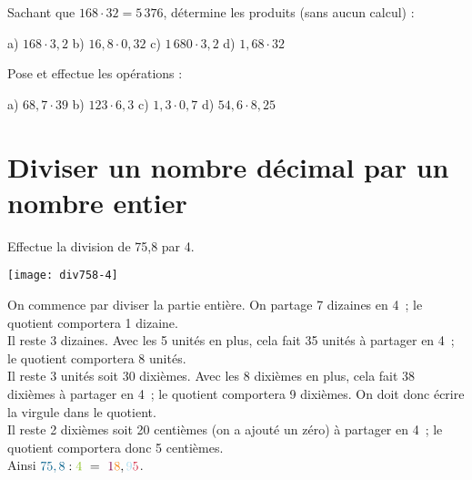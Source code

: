 
Sachant que $168 \cdot 32 = 5\,376$, détermine les produits (sans aucun calcul) :

a) $168 \cdot 3,2$ \hfill b) $16,8 \cdot 0,32$ \hfill  c) $1\,680 \cdot 3,2$ \hfill d) $1,68 \cdot 32$

Pose et effectue les opérations :

a) $68,7 \cdot 39$ \hfill b) $123 \cdot 6,3$ \hfill c) $1,3 \cdot 0,7$ \hfill d) $54,6 \cdot 8,25$

\section{Diviser un nombre décimal par un nombre entier}

\begin{exemple*1}
Effectue la division de 75,8 par 4.\\[1em]

\begin{minipage}[c]{.26\textwidth}
\vspace{0em}
\begin{center}\texttt{[image: div758-4]} \end{center}

\end{minipage}\hfill%
\begin{minipage}[c]{.66\textwidth}

On commence par diviser la partie entière. On partage \textcolor{A1}{7} dizaines en \textcolor{H1}{4} ; le quotient comportera \textcolor{C1}{1} dizaine.\\[0.75em]
Il reste 3 dizaines. Avec les \textcolor{A1}{5} unités en plus, cela fait 35 unités à partager en \textcolor{H1}{4} ; le quotient comportera \textcolor{J1}{8} unités. \\[0.75em]
Il reste 3 unités soit 30 dixièmes. Avec les \textcolor{A1}{8} dixièmes en plus, cela fait 38 dixièmes à partager en \textcolor{H1}{4} ; le quotient comportera \textcolor{A3}{9} dixièmes. On doit donc écrire la virgule dans le quotient.\\[0.75em]
Il reste 2 dixièmes soit 20 centièmes (on a ajouté un zéro) à partager en \textcolor{H1}{4} ; le quotient comportera donc \textcolor{B2}{5} centièmes.\\[0.75em]
Ainsi $\textcolor{A1}{75,8} : \textcolor{H1}{4} = \textcolor{C1}{1}\textcolor{J1}{8},\textcolor{A3}{9}\textcolor{B2}{5}$.
\end{minipage}

\end{exemple*1}

